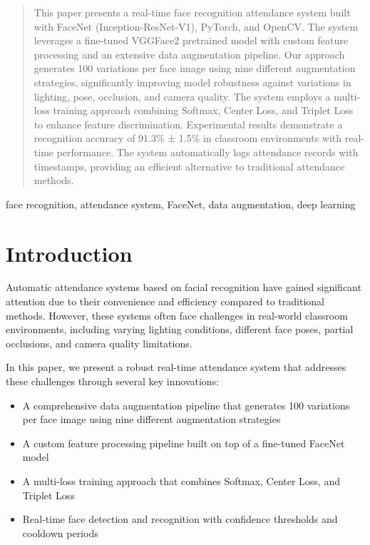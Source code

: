 \documentclass[conference]{IEEEtran}
\begin{document}
\begin{abstract}
This paper presents a real-time face recognition attendance system built with FaceNet (Inception-ResNet-V1), PyTorch, and OpenCV. The system leverages a fine-tuned VGGFace2 pretrained model with custom feature processing and an extensive data augmentation pipeline. Our approach generates 100 variations per face image using nine different augmentation strategies, significantly improving model robustness against variations in lighting, pose, occlusion, and camera quality. The system employs a multi-loss training approach combining Softmax, Center Loss, and Triplet Loss to enhance feature discrimination. Experimental results demonstrate a recognition accuracy of 91.3\% ± 1.5\% in classroom environments with real-time performance. The system automatically logs attendance records with timestamps, providing an efficient alternative to traditional attendance methods.
\end{abstract}

\begin{IEEEkeywords}
face recognition, attendance system, FaceNet, data augmentation, deep learning
\end{IEEEkeywords}

\section{Introduction}
Automatic attendance systems based on facial recognition have gained significant attention due to their convenience and efficiency compared to traditional methods. However, these systems often face challenges in real-world classroom environments, including varying lighting conditions, different face poses, partial occlusions, and camera quality limitations.

In this paper, we present a robust real-time attendance system that addresses these challenges through several key innovations:

\begin{itemize}
\item A comprehensive data augmentation pipeline that generates 100 variations per face image using nine different augmentation strategies
\item A custom feature processing pipeline built on top of a fine-tuned FaceNet model
\item A multi-loss training approach that combines Softmax, Center Loss, and Triplet Loss
\item Real-time face detection and recognition with confidence thresholds and cooldown periods
\end{itemize}
\end{document}

